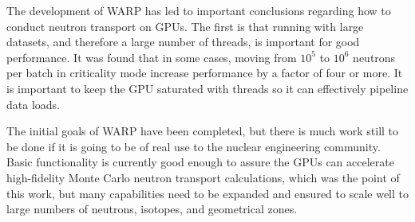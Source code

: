 \documentclass[preprint,12pt]{elsarticle}
\begin{document}


The development of WARP has led to important conclusions regarding how to conduct neutron transport on GPUs.  The first is that running with large datasets, and therefore a large number of threads, is important for good performance.  It was found that in some cases, moving from $10^5$ to $10^6$ neutrons per batch in criticality mode increase performance by a factor of four or more.  It is important to keep the GPU saturated with threads so it can effectively pipeline data loads.  

The initial goals of WARP have been completed, but there is much work still to be done if it is going to be of real use to the nuclear engineering community.  Basic functionality is currently good enough to assure the GPUs can accelerate high-fidelity Monte Carlo neutron transport calculations, which was the point of this work, but many capabilities need to be expanded and ensured to scale well to large numbers of neutrons, isotopes, and geometrical zones.
\end{document}
